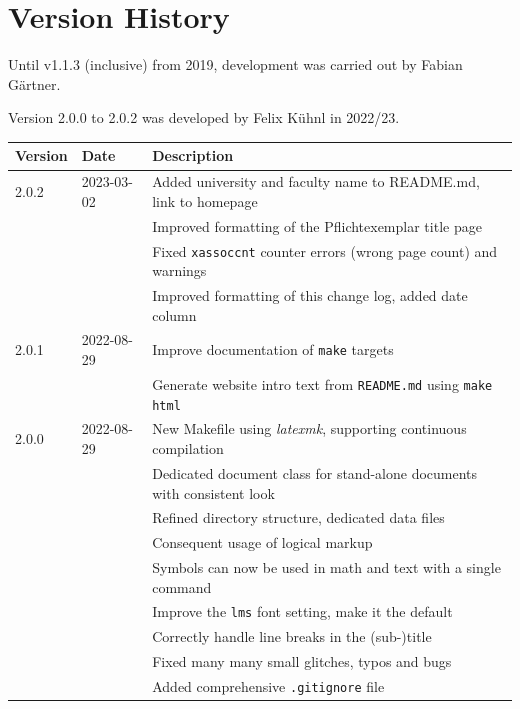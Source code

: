 
\chapter{Version History}%
\label{AppendixC}

Until v1.1.3 (inclusive) from 2019, development was carried out by Fabian
G\"artner.

Version 2.0.0 to 2.0.2 was developed by Felix K\"uhnl in 2022/23.

\begin{longtable}{lll}
    \toprule
    \textbf{Version} & \textbf{Date} & \textbf{Description}\\
    \midrule \endhead
    2.0.2 & 2023-03-02
          & Added university and faculty name to README.md, link to homepage\\
         && Improved formatting of the Pflichtexemplar title page\\
         && Fixed \texttt{xassoccnt} counter errors (wrong page count) and warnings\\
         && Improved formatting of this change log, added date column\\
    2.0.1 & 2022-08-29
          & Improve documentation of \texttt{make} targets\\
         && Generate website intro text from \texttt{README.md} using \texttt{make html}\\
    2.0.0 & 2022-08-29
          & New Makefile using \emph{latexmk}, supporting continuous compilation\\
         && Dedicated document class for stand-alone documents with consistent look\\
         && Refined directory structure, dedicated data files\\
         && Consequent usage of logical markup\\
         && Symbols can now be used in math and text with a single command\\
         && Improve the \texttt{lms} font setting, make it the default\\
         && Correctly handle line breaks in the (sub-)title\\
         && Fixed many many small glitches, typos and bugs\\
         && Added comprehensive \texttt{.gitignore} file \\

\end{longtable}
